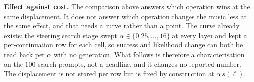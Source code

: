 \documentclass{article}
\begin{document}
%
\textbf{Effect against cost.} The comparison above answers which operation wins at the
same displacement. It does not answer which operation changes the music less at the same
effect, and that needs a curve rather than a point. The curve already exists: the
steering search stage swept $\alpha\in\{0.25,\dots,16\}$ at every layer and kept a
per-continuation row for each cell, so success and likelihood change can both be read
back per $\alpha$ with no generation. What follows is therefore a characterisation on
the $100$ search prompts, not a headline, and it changes no reported number. The
displacement is not stored per row but is fixed by construction at
$\alpha\,\bar{s}(\ell)$.
\end{document}
